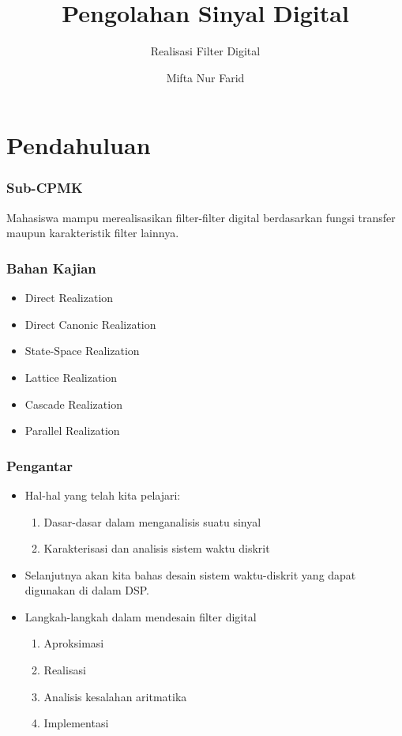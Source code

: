 \documentclass[pdflatex,compress,mathserif]{beamer}
\title{Pengolahan Sinyal Digital}
\subtitle{Realisasi Filter Digital}
\author{Mifta Nur Farid}
\begin{document}
\maketitle

\section{Pendahuluan}

\begin{frame}
	\frametitle{Sub-CPMK}
	Mahasiswa mampu merealisasikan filter-filter digital berdasarkan fungsi transfer maupun karakteristik filter lainnya.
\end{frame}

\begin{frame}
	\frametitle{Bahan Kajian}
	\begin{itemize}
		\item Direct Realization
		\item Direct Canonic Realization
		\item State-Space Realization
		\item Lattice Realization
		\item Cascade Realization
		\item Parallel Realization
	\end{itemize}
\end{frame}

\begin{frame}
	\frametitle{Pengantar}
	\begin{itemize}
		\item Hal-hal yang telah kita pelajari:
		\begin{enumerate}
			\item Dasar-dasar dalam menganalisis suatu sinyal
			\item Karakterisasi dan analisis sistem waktu diskrit
		\end{enumerate}
		\item Selanjutnya akan kita bahas desain sistem waktu-diskrit yang dapat digunakan di dalam DSP.
		\item Langkah-langkah dalam mendesain filter digital
		\begin{enumerate}
			\item Aproksimasi
			\item Realisasi
			\item Analisis kesalahan aritmatika
			\item Implementasi
		\end{enumerate}
	\end{itemize}
\end{frame}
\end{document}
